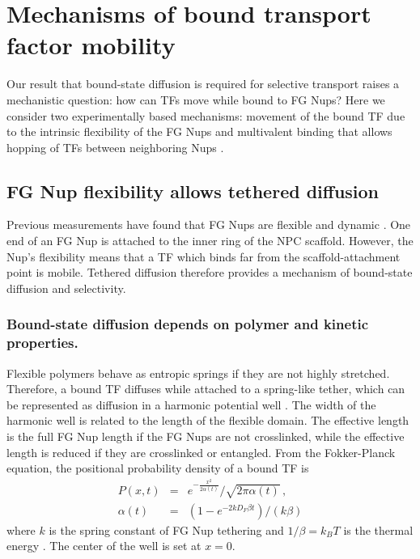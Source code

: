 \section{Mechanisms of  bound transport factor mobility}

Our result that bound-state diffusion is required for selective transport raises a mechanistic question: how can TFs move while bound to FG Nups? Here we consider two experimentally based mechanisms: movement of the bound TF due to the intrinsic flexibility of the FG Nups \cite{patel07} and multivalent binding that allows hopping of TFs between neighboring Nups \cite{raveh16}.

\subsection{FG Nup flexibility allows tethered diffusion}
Previous measurements have found that FG Nups are flexible and dynamic \cite{lim07, milles14, hough15}.  One end of an FG Nup is attached to the inner ring of the NPC scaffold.  However, the Nup's flexibility means that a TF which binds far from the scaffold-attachment point is mobile.  Tethered diffusion therefore provides a mechanism of bound-state diffusion and selectivity.

\subsubsection{Bound-state diffusion depends on polymer and kinetic properties.}
Flexible polymers behave as entropic springs \cite{howard01} if they are not highly stretched. Therefore, a bound TF diffuses while attached to a spring-like tether, which can be represented as diffusion in a harmonic potential well .  The width of the harmonic well is related to the length of the flexible domain.  The effective length is the full FG Nup length if the FG Nups are not crosslinked, while the effective length is reduced if they are crosslinked or entangled\cite{ribbeck01}.  From the Fokker-Planck equation, the positional probability density of a bound TF is 
\begin{eqnarray}
P(x,t) &=& e^{-\frac{x^2}{2 \alpha(t)}}/\sqrt{2\pi \alpha(t)}\,,\\
\alpha(t) &=& (1-e^{-2kD_F\beta t})/(k\beta)
\end{eqnarray}
 where $k$ is the spring constant of FG Nup tethering and $1/\beta = k_BT$ is the thermal energy \cite{doi88}.  The center of the well is set at $x=0$.  

